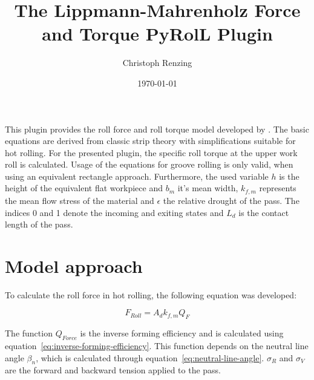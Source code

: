 \documentclass[11pt]{PyRollDocs}
\begin{document}
    \title{The Lippmann-Mahrenholz Force and Torque PyRolL Plugin}
    \author{Christoph Renzing}
    \date{\today}

    \maketitle

    This plugin provides the roll force and roll torque model developed by \textcite{Lippmann_Mahrenholtz_1967}.
    The basic equations are derived from classic strip theory with simplifications suitable for hot rolling.
    For the presented plugin, the specific roll torque at the upper work roll is calculated.
    Usage of the equations for groove rolling is only valid, when using an equivalent rectangle approach.
    Furthermore, the used variable $h$ is the height of the equivalent flat workpiece and $b_m$ it's mean width,
    $k_{f,m}$ represents the mean flow stress of the material and $\epsilon$ the relative drought of the pass.
    The indices 0 and 1 denote the incoming and exiting states and $L_d$ is the contact length of the pass.


    \section{Model approach}\label{sec:model-approach}

    To calculate the roll force in hot rolling, the following equation was developed:

    \begin{equation}
        F_{Roll} = A_d k_{f,m} Q_F
        \label{eq:lippmann-mahrenholz-force}
    \end{equation}

    The function $Q_{Force}$ is the inverse forming efficiency and is calculated using equation~\eqref{eq:inverse-forming-efficiency}.
    This function depends on the neutral line angle $\beta_n$, which is calculated through equation~\eqref{eq:neutral-line-angle}.
    $\sigma_R$ and $\sigma_V$ are the forward and backward tension applied to the pass.
\end{document}
